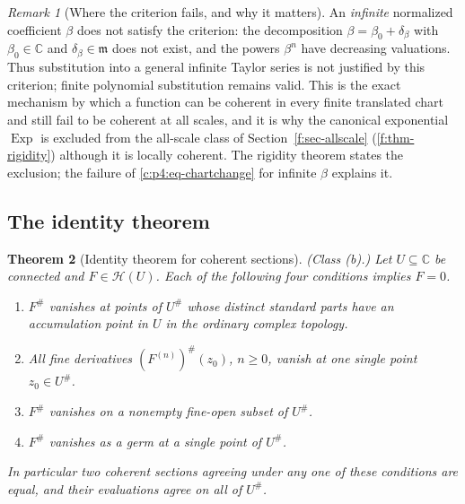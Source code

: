 \documentclass[11pt,a4paper]{article}
\numberwithin{equation}{section}
\newtheorem{theorem}{Theorem}[section]
\theoremstyle{definition}
\theoremstyle{remark}
\newtheorem{remark}[theorem]{Remark}
\theoremstyle{plain}
\newcommand{\CC}{\mathbb C}
\newcommand{\mm}{\mathfrak m}
\DeclareMathOperator{\Exp}{Exp}
\newcommand{\halo}[1]{#1^{\#}}
\newcommand{\ev}[1]{#1^{\#}}
\newcommand{\Hc}{\mathcal H}
\begin{document}
\begin{remark}[Where the criterion fails, and why it matters]
\label{c:p4:rk-infinitecoeff}
An \emph{infinite} normalized coefficient $\beta$ does not satisfy the
criterion: the decomposition $\beta=\beta_0+\delta_\beta$ with
$\beta_0\in\CC$ and $\delta_\beta\in\mm$ does not exist, and the powers
$\beta^n$ have decreasing valuations. Thus substitution into a general
infinite Taylor series is not justified by this criterion; finite
polynomial substitution remains valid. This is the exact mechanism by
which a function can be coherent in every finite translated chart and
still fail to be coherent at all scales, and it is why the canonical
exponential $\Exp$ is excluded from the all-scale class of
Section~\ref{f:sec-allscale} (\ref{f:thm-rigidity}) although it is locally coherent.
The rigidity theorem states the exclusion; the failure of
\eqref{c:p4:eq-chartchange} for infinite $\beta$ explains it.
\end{remark}

\subsection{The identity theorem}
\label{c:p4:identitysec}

\begin{theorem}[Identity theorem for coherent sections]
\label{c:p4:identity}
\emph{(Class (b).)} Let $U\subseteq\CC$ be connected and
$F\in\Hc(U)$. Each of the following four conditions implies $F=0$.
\begin{enumerate}[label=(\roman*)]
\item $\ev F$ vanishes at points of $\halo U$ whose distinct
\emph{standard parts} have an accumulation point in $U$ in the ordinary
complex topology.
\item All fine derivatives $\ev{(F^{(n)})}(z_0)$, $n\ge0$, vanish at one
single point $z_0\in\halo U$.
\item $\ev F$ vanishes on a nonempty fine-open subset of $\halo U$.
\item $\ev F$ vanishes as a germ at a single point of $\halo U$.
\end{enumerate}
In particular two coherent sections agreeing under any one of these
conditions are equal, and their evaluations agree on all of $\halo U$.
\end{theorem}
\end{document}
